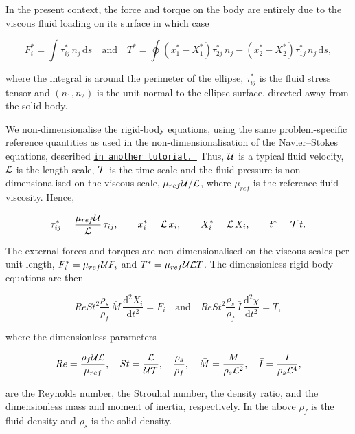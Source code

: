 In the present context, the force and torque on the body are entirely due to the viscous fluid loading on its surface in which case \begin{center} \[ F^{*}_{i} = \int \tau^{*}_{ij}\, n_{j}\, \mbox{d} s \quad\mbox{and}\quad T^{*} = \oint (x^{*}_{1} - X^{*}_{1}) \tau^{*}_{2j}\,n_{j} - (x^{*}_{2} - X^{*}_{2}) \tau^{*}_{1j}\,n_{j}\, \mbox{d} s, \] \end{center}  where the integral is around the perimeter of the ellipse, $\tau^{*}_{ij}$ is the fluid stress tensor and $(n_{1},n_{2})$ is the unit normal to the ellipse surface, directed away from the solid body.

We non-\/dimensionalise the rigid-\/body equations, using the same problem-\/specific reference quantities as used in the non-\/dimensionalisation of the Navier--Stokes equations, described \href{../../../../doc/navier_stokes/driven_cavity/html/index.html}{\tt in another tutorial. } Thus, $ {\cal U}$ is a typical fluid velocity, $ {\cal L} $ is the length scale, ${\cal T}$ is the time scale and the fluid pressure is non-\/dimensionalised on the viscous scale, $ \mu_{ref} {\cal U}/{\cal L} $, where $ \mu_{ref} $ is the reference fluid viscosity. Hence, \begin{center} \[ \tau^{*}_{ij} = \frac{\mu_{ref} {\cal U}}{{\cal L}} \, \tau_{ij}, \qquad x_i^{*} = {\cal L}\, x_i, \qquad X_i^* = {\cal L}\, X_i, \qquad t^* = {\cal T}\, t. \] \end{center}  The external forces and torques are non-\/dimensionalised on the viscous scales per unit length, $ F^{*}_{i} = \mu_{ref} {\cal U} F_{i} $ and $ T^{*} = \mu_{ref} {\cal U} {\cal L} T $. The dimensionless rigid-\/body equations are then \begin{center} \[ Re St^{2} \frac{\rho_{s}}{\rho_{f}}\, \bar{M}\, \frac{\mbox{d}^{2} X_{i}}{\mbox{d} t^{2}} = F_{i} \quad \mbox{and} \quad Re St^{2} \frac{\rho_{s}}{\rho_{f}}\, \bar{I}\, \frac{\mbox{d}^{2} \chi}{\mbox{d} t^{2}} = T, \] \end{center}  where the dimensionless parameters \begin{center} \[ Re = \frac{\rho_{f} {\cal U}{\cal L}}{\mu_{ref}}, \quad St = \frac{\cal L}{{\cal U}{\cal T}},\quad \frac{\rho_{s}}{\rho_{f}}, \quad \bar{M} = \frac{M}{\rho_{s} {\cal L}^{2}}, \quad \bar{I} = \frac{I}{\rho_{s} {\cal L}^{4}}, \] \end{center}  are the Reynolds number, the Strouhal number, the density ratio, and the dimensionless mass and moment of inertia, respectively. In the above $ \rho_{f} $ is the fluid density and $ \rho_{s} $ is the solid density.

